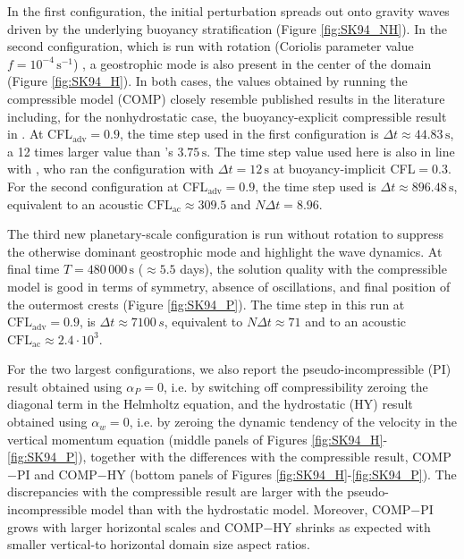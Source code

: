 \documentclass[12pt,a4paper]{article}
\theoremstyle{definition}
\newcommand{\dt}{\Delta t}
\begin{document}
In the first configuration, the initial perturbation spreads out onto gravity waves driven by the underlying buoyancy stratification (Figure \ref{fig:SK94_NH}). In the second configuration, which is run with rotation (Coriolis parameter value $f=10^{-4}\,\textrm{s}^{-1}$) , a geostrophic mode is also present in the center of the domain (Figure \ref{fig:SK94_H}). In both cases, the values obtained by running the compressible model (COMP) closely resemble published results in the literature including, for the nonhydrostatic case, the buoyancy-explicit compressible result in \cite{BenacchioEtAl2014}. At CFL$_\textrm{adv}=0.9$, the time step used in the first configuration is $\Delta t\approx44.83\,\textrm{s}$, a 12 times larger value than \cite{BenacchioEtAl2014}'s $3.75\,\textrm{s}$. The time step value used here is also in line with \cite{MelvinEtAl2018}, who ran the configuration with $\dt=12\,\textrm{s}$ at buoyancy-implicit CFL$=0.3$. For the second configuration at CFL$_\textrm{adv}=0.9$, the time step used is $\Delta t\approx896.48\,\textrm{s}$, equivalent to an acoustic $\mathrm{CFL}_{\mathrm{ac}}\approx309.5$ and $N\dt = 8.96$.

The third new planetary-scale configuration is run without rotation to suppress the otherwise dominant geostrophic mode and highlight the wave dynamics. At final time $T=480\,000\,\textrm{s}$ ($\approx5.5$ days), the solution quality with the compressible model is good in terms of symmetry, absence of oscillations, and final position of the outermost crests (Figure \ref{fig:SK94_P}). The time step in this run at $\mathrm{CFL}_\mathrm{adv} = 0.9$, is $\dt\approx7100\,s$, equivalent to $N \dt\approx71$ and to an acoustic $\mathrm{CFL}_\mathrm{ac}\approx2.4\cdot 10^3$.

For the two largest configurations, we also report the pseudo-incompressible (PI) result obtained using $\alpha_P=0$, i.e. by switching off compressibility zeroing the diagonal term in the Helmholtz equation, and the hydrostatic (HY) result obtained using $\alpha_w=0$, i.e. by zeroing the dynamic tendency of the velocity in the vertical momentum equation (middle panels of Figures \ref{fig:SK94_H}-\ref{fig:SK94_P}), together with the differences with the compressible result, COMP$-$PI and COMP$-$HY (bottom panels of Figures \ref{fig:SK94_H}-\ref{fig:SK94_P}). The discrepancies with the compressible result are larger with the pseudo-incompressible model than with the hydrostatic model. Moreover, COMP$-$PI grows with larger horizontal scales and COMP$-$HY shrinks as expected with smaller vertical-to horizontal domain size aspect ratios.
\end{document}
